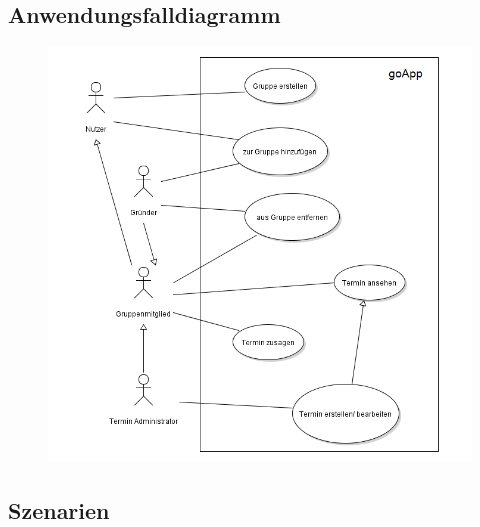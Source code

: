 \documentclass{scrartcl}
\begin{document}
	\subsection{Anwendungsfalldiagramm}
	\begin{figure}[h]
		\includegraphics[width=\textwidth]{goApp_useCase}
	\end{figure}
	
	\newpage
	
	\subsection{Szenarien}
\end{document}
